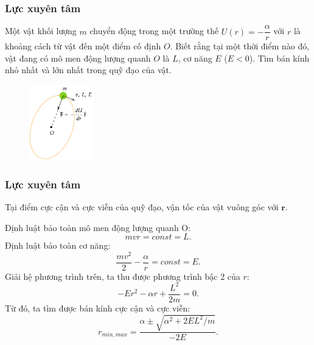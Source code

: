 \begin{frame}
\frametitle{Lực xuyên tâm}
Một vật khối lượng \(m\) chuyển động trong một trường thế \(U(r)=-\dfrac{\alpha}{r}\) với \(r\) là khoảng cách từ vật đến một điểm cố định \(O\). Biết rằng tại một thời điểm nào đó, vật đang có mô men động lượng quanh \(O\) là \(L\), cơ năng \(E\) (\(E<0\)). Tìm bán kính nhỏ nhất và lớn nhất trong quỹ đạo của vật.
\begin{figure}
    \centering
    \includegraphics[width=0.25\textwidth]{Content/Figure/lucxuyentam.png}
\end{figure}
\end{frame}

\begin{frame}
\frametitle{Lực xuyên tâm}
\scriptsize
Tại điểm cực cận và cực viễn của quỹ đạo, vận tốc của vật vuông góc với \(\mathbf r\).

Định luật bảo toàn mô men động lượng quanh O:
\begin{equation*}
    m v r= const = L.
\end{equation*}
Định luật bảo toàn cơ năng:
\begin{equation*}
    \frac{m v^2}{2} - \dfrac{\alpha}{r} = const = E.
\end{equation*}
Giải hệ phương trình trên, ta thu được phương trình bậc 2 của \(r\):
\begin{equation*}
    -E r^2 - \alpha r + \frac{L^2}{2m} = 0.
\end{equation*}
Từ đó, ta tìm được bán kính cực cận và cực viễn:
\begin{equation}
    r_{min,max} = \frac{\alpha \pm \sqrt{\alpha^2 + 2 E L^2 / m}}{-2E}.
\end{equation}
\normalsize
\end{frame}